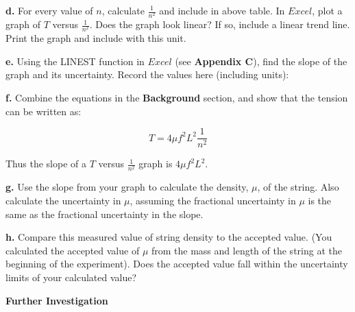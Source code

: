 \textbf{d. } For every value of $n$, calculate $\frac{1}{n^2}$ and include in above table. In $Excel$, plot a graph of $T$ versus $\frac{1}{n^2}$. Does the graph look linear? If so, include a linear trend line. Print the graph and include with this unit.
\vspace{20mm}

\textbf{e. } Using the LINEST function in $Excel$ (see \textbf{Appendix C}), find the slope of the graph and its uncertainty. Record the values here (including units):

\vspace{20mm}

\textbf{f. } Combine the equations in the \textbf{Background } section, and show that the tension can be written as:

\begin{equation}
T=4\mu f^{2}L^{2}\frac{1}{n^2}
\end{equation}

\vspace{25mm}

Thus the slope of a $T$ versus $\frac{1}{n^2}$ graph is $4\mu f^{2}L^{2}$.

\textbf{g. } Use the slope from your graph to calculate the density, $\mu $, of the string. Also calculate the uncertainty in $\mu$, assuming the fractional uncertainty in $\mu$ is the same as the fractional uncertainty in the slope.

\vspace{5cm}

\textbf{h. } Compare this measured value of string density to the accepted value. (You calculated the accepted value of $\mu $ from the mass and length of the string at the beginning of the experiment). Does the accepted value fall within the uncertainty limits of your calculated value?

\vspace{50mm}




\textbf{Further Investigation}


